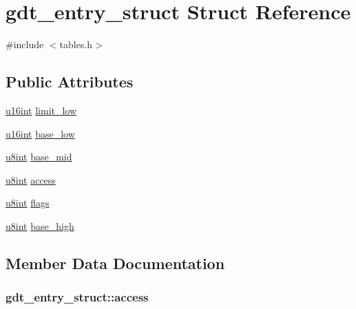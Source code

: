 \hypertarget{structgdt__entry__struct}{}\section{gdt\+\_\+entry\+\_\+struct Struct Reference}
\label{structgdt__entry__struct}


{\ttfamily \#include $<$tables.\+h$>$}

\subsection*{Public Attributes}
\begin{DoxyCompactItemize}
\item 
\hyperlink{system_8h_a863d9497073aad2b991aeab2211d87af}{u16int} \hyperlink{structgdt__entry__struct_ada721fbdc3e8d3feae3b07d4b82a37bd}{limit\+\_\+low}
\item 
\hyperlink{system_8h_a863d9497073aad2b991aeab2211d87af}{u16int} \hyperlink{structgdt__entry__struct_a90f05cd7f227a34e977a639843a23275}{base\+\_\+low}
\item 
\hyperlink{system_8h_a1026e682ffdadc1701c42cd44ce9efcf}{u8int} \hyperlink{structgdt__entry__struct_a0369f1e190c433425c5b0f40c2070715}{base\+\_\+mid}
\item 
\hyperlink{system_8h_a1026e682ffdadc1701c42cd44ce9efcf}{u8int} \hyperlink{structgdt__entry__struct_a7457cb21f29e919a8ea62fc0110ac238}{access}
\item 
\hyperlink{system_8h_a1026e682ffdadc1701c42cd44ce9efcf}{u8int} \hyperlink{structgdt__entry__struct_afac75bdf53080168c8899c442862410a}{flags}
\item 
\hyperlink{system_8h_a1026e682ffdadc1701c42cd44ce9efcf}{u8int} \hyperlink{structgdt__entry__struct_aa03c14867c293012449a3b18a07f45f2}{base\+\_\+high}
\end{DoxyCompactItemize}


\subsection{Member Data Documentation}
\hypertarget{structgdt__entry__struct_a7457cb21f29e919a8ea62fc0110ac238}{}
\subsubsection[{access}]{ gdt\+\_\+entry\+\_\+struct\+::access}\label{structgdt__entry__struct_a7457cb21f29e919a8ea62fc0110ac238}
\hypertarget{structgdt__entry__struct_aa03c14867c293012449a3b18a07f45f2}{}

